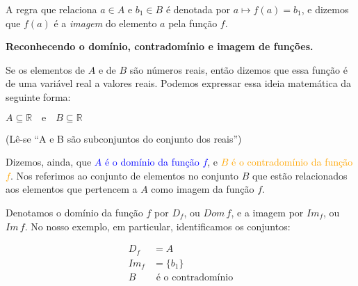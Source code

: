 \documentclass[12pt,openright,twoside,a4paper]{article}
\theoremstyle{definition}
\begin{document}
	A regra que relaciona $a \in A$ e $b_1 \in B$ é denotada por $a \mapsto f(a) = b_1$, e dizemos que $f(a)$ é a \textit{imagem} do elemento $a$ pela função $f$.

	
	\textbf{Reconhecendo o domínio, contradomínio e imagem de funções.}
	
	Se os elementos de $A$ e de $B$ são números reais, então dizemos que essa função é de uma variável real a valores reais. Podemos expressar essa ideia matemática da seguinte forma:
	
	\begin{center}
		$A \subseteq \mathbb{R} \quad \text{e} \quad B \subseteq \mathbb{R}$
		
		(Lê-se ``A e B são subconjuntos do conjunto dos reais'')
	\end{center}

	
	Dizemos, ainda, que \textcolor{blue}{$A$ é o domínio da função $f$}, e \textcolor{orange}{$B$ é o contradomínio da função $f$}. Nos referimos ao conjunto de elementos no conjunto $B$ que estão relacionados aos elementos que pertencem a $A$ como imagem da função $f$.
	
	Denotamos o domínio da função $f$ por $D_f$, ou $Dom\,f$, e a imagem por $Im_f$, ou $Im\,f$. No nosso exemplo, em particular, identificamos os conjuntos:
	
	\begin{align*}
		D_f &= A\\
		Im_f &= \{b_1\}\\
		B &\text{ é o contradomínio}
	\end{align*}
	
\end{document}

